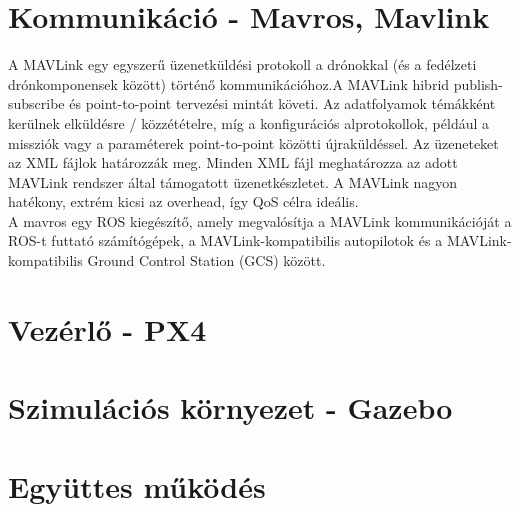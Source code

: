 \section{Kommunikáció - Mavros, Mavlink}
A MAVLink egy egyszerű üzenetküldési protokoll a drónokkal (és a fedélzeti drónkomponensek között) történő kommunikációhoz.A MAVLink hibrid publish-subscribe és point-to-point tervezési mintát követi. Az adatfolyamok témákként kerülnek elküldésre / közzétételre, míg a konfigurációs alprotokollok, például a missziók vagy a paraméterek point-to-point közötti újraküldéssel. Az üzeneteket az XML fájlok határozzák meg. Minden XML fájl meghatározza az adott MAVLink rendszer által támogatott üzenetkészletet. \cite{mavlink} A MAVLink nagyon hatékony, extrém kicsi az overhead, így QoS célra ideális. \\
\noindent
A mavros egy ROS kiegészítő, amely megvalósítja a MAVLink kommunikációját a ROS-t futtató számítógépek, a MAVLink-kompatibilis autopilotok és a MAVLink-kompatibilis Ground Control Station (GCS) között.
\section{Vezérlő - PX4}
\section{Szimulációs környezet - Gazebo}
\section{Együttes működés}